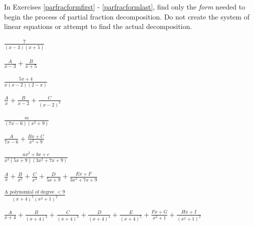 \documentclass{ximera}
\begin{document}
	\author{Stitz-Zeager}



\label{ExercisesforParFrac}

\begin{question}
In Exercises \ref{parfracformfirst} - \ref{parfracformlast},  find only the \emph{form} needed to begin the process of partial fraction decomposition.  Do not create the system of linear equations or attempt to find the actual decomposition.

\begin{problem}\label{parfracformfirst}
$\frac{7}{(x - 3)(x + 5)}$

\begin{solution}
$\frac{A}{x - 3} + \frac{B}{x + 5}$
\end{solution}
\end{problem}

\begin{problem}
$\frac{5x + 4}{x(x - 2)(2 - x)}$

\begin{solution}
$\frac{A}{x} + \frac{B}{x - 2} + \frac{C}{(x - 2)^{2}}$
\end{solution}
\end{problem}

\begin{problem}
$\frac{m}{(7x - 6)(x^{2} + 9)}$

\begin{solution}
$\frac{A}{7x - 6} + \frac{Bx + C}{x^{2} + 9}$
\end{solution}
\end{problem}

\begin{problem}
$\frac{ax^{2} + bx + c}{x^3(5x + 9)(3x^{2} + 7x + 9)}$

\begin{solution}
$\frac{A}{x} + \frac{B}{x^{2}} + \frac{C}{x^{3}} + \frac{D}{5x + 9} + \frac{Ex + F}{3x^{2} + 7x + 9}$
\end{solution}
\end{problem}

\begin{problem}
$\frac{\text{A polynomial of degree } < 9}{(x + 4)^{5}(x^{2} + 1)^{2}}$

\begin{solution}
$\frac{A}{x + 4} + \frac{B}{(x + 4)^{2}} + \frac{C}{(x + 4)^{3}} + \frac{D}{(x + 4)^{4}} + \frac{E}{(x + 4)^{5}} + \frac{Fx + G}{x^{2} + 1} + \frac{Hx + I}{(x^{2} + 1)^{2}}$
\end{solution}
\end{problem}


\end{question}
\end{document}

